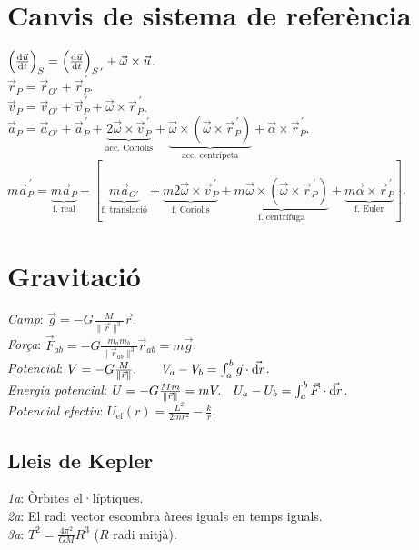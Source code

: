 \documentclass[10pt]{article}
\newcommand{\lp}{\left(}
\newcommand{\rp}{\right)}
\newcommand{\ci}{\textbullet\;}
\begin{document}
\begin{multicols}{3}
\section{Canvis de sistema de referència}
\ci $\lp \frac{\dif \vec{u}}{\dif t} \rp_S=\lp \frac{\dif \vec{u}}{\dif t} \rp_{S^{\, \prime}}+\vec{\omega}\times \vec{u}$. \\
\ci $\vec{r}_P = \vec{r}_{O'} + \vec{r}_{P}^{\, \prime}$. \\
\ci $\vec{v}_P = \vec{v}_{O'} + \vec{v}_{P}^{\, \prime} + \vec{\omega}\times\vec{r}_{P}^{\, \prime}$. \\
\ci $\vec{a}_P = \vec{a}_{O'} + \vec{a}_{P}^{\, \prime} + \underbrace{2\vec{\omega}\times\vec{v}_{P}^{\, \prime}}_{\text{acc. Coriolis}} + \underbrace{\vec{\omega}\times \lp \vec{\omega}\times \vec{r}_{P}^{\, \prime} \rp}_{\text{acc. centrípeta}} + \vec{\alpha}\times\vec{r}_{P}^{\, \prime}$. \\
\ci $m\vec{a}_{P}^{\, \prime} = \underbrace{m\vec{a}_P}_{\text{f. real}} - [ \underbrace{m\vec{a}_{O'}}_{\text{f. translació}} + \underbrace{m2\vec{\omega}\times\vec{v}_{P}^{\, \prime}}_{\text{f. Coriolis}} + \underbrace{m\vec{\omega}\times \lp \vec{\omega}\times \vec{r}_{P}^{\, \prime} \rp}_{\text{f. centrífuga}} + \underbrace{m\vec{\alpha}\times\vec{r}_{P}^{\, \prime}}_{\text{f. Euler}} ]$.


\section{Gravitació}
\emph{Camp}: $\vec{g} = -G \frac{M}{\|\vec{r}\|^3} \vec{r}$. \\
\emph{Força}: $\vec{F}_{ab} = -G \frac{m_a m_b}{\|\vec{r}_{ab}\|^3} \vec{r}_{ab}=m\vec{g}$. \\
\emph{Potencial}: $V = -G \frac{M}{\|\vec{r}\|}. \qquad V_a-V_b = \int_a^b \vec{g} \cdot \vec{\dif r}$. \\
\emph{Energia potencial}: $U = -G \frac{Mm}{\|\vec{r}\|}=mV. \quad U_a-U_b = \int_a^b \vec{F} \cdot \vec{\dif r}$.\\
\emph{Potencial efectiu}: $U_\text{ef}(r) = \frac{L^2}{2mr^2} - \frac{k}{r}$.

\subsection{Lleis de Kepler}
\emph{1a}: Òrbites el·líptiques. \\
\emph{2a}: El radi vector escombra àrees iguals en temps iguals. \\
\emph{3a}: $T^2=\frac{4\pi^2}{GM}R^3$ ($R$ radi mitjà).


\end{multicols}
\end{document}
